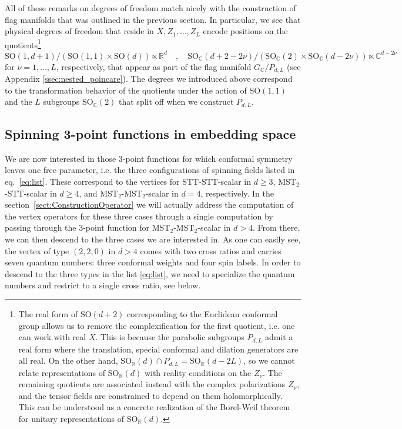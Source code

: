 \documentclass{article}
\def\bC{\mathbb{C}}
\begin{document}
All of these remarks on degrees of freedom match nicely with the construction of 
flag manifolds that was outlined in 
the previous section. In particular, we see that physical degrees of freedom that 
reside in $X, Z_1, \dots, Z_L$ encode positions on the quotients\footnote{The 
real form of $\mathrm{SO}(d+2)$ corresponding to the Euclidean conformal group 
allows us to remove the complexification for the first quotient, i.e. one can 
work with real $X$. This is because the parabolic subgroups $P_{d,L}$ admit a 
real form where the translation, special conformal and dilation generators are 
all real. On the other hand, $\mathrm{SO}_\mathbb{R}(d) \cap P_{d,L} = 
\mathrm{SO}_\mathbb{R}(d-2L)$, so we cannot relate representations of 
$\mathrm{SO}_\mathbb{R}(d)$ with reality conditions on the $Z_{\nu}$. The remaining quotients are associated instead with the complex polarizations $Z_\nu$, and the tensor fields are constrained to depend on them holomorphically. This can be understood as a concrete realization of the Borel-Weil theorem for 
unitary representations of $\mathrm{SO}_{\mathbb{R}}(d)$.}  
\begin{equation} 
\mathrm{SO}(1,d+1)/(\mathrm{SO}(1,1) \times \mathrm{SO}(d))\ltimes \mathbb{R}^d 
\quad , \quad 
\mathrm{SO}_\bC(d+2-2\nu)/(\mathrm{SO}_\bC(2) \times \mathrm{SO}_\bC(d-2\nu))\ltimes 
\mathbb{C}^{d-2\nu} 
\end{equation} 
for $\nu = 1, \dots, L$, respectively, that appear as part of the flag manifold 
$G_{\bC}/P_{d,L}$ (see Appendix \ref{ssec:nested_poincare}). The degrees we 
introduced above correspond to the transformation behavior of the quotients under 
the action of $\mathrm{SO}(1,1)$ and the $L$ subgroups $\mathrm{SO}_\bC(2)$ that 
split off when we construct $P_{d,L}$. 

\subsection{Spinning 3-point functions in embedding space}
\label{ssec:3ptI-II} 

We are now interested in those 3-point functions for which conformal symmetry 
leaves one free parameter, i.e. the three configurations of spinning fields 
listed in eq.\ \eqref{eq:list}. These correspond to the vertices for STT-STT-scalar 
in $d\ge 3$, MST$_2$-STT-scalar in $d\ge 4$, and MST$_2$-MST$_2$-scalar in $d=4$, 
respectively. In the section~\ref{sect:ConstructionOperator} we will actually address the computation of the 
vertex operators for these three cases through a single computation by passing 
through the 3-point function for MST$_2$-MST$_2$-scalar in $d > 4$. From there, we can then descend to the three cases we are interested in. As one can easily see, 
the vertex of type $(2,2,0)$ in $d > 4$ comes with two cross ratios and carries seven quantum numbers: three conformal weights and four spin labels. 
In order to descend to the three types in the list \eqref{eq:list}, we need to 
specialize the quantum numbers and restrict to a single cross ratio, see 
below. 
\end{document}
